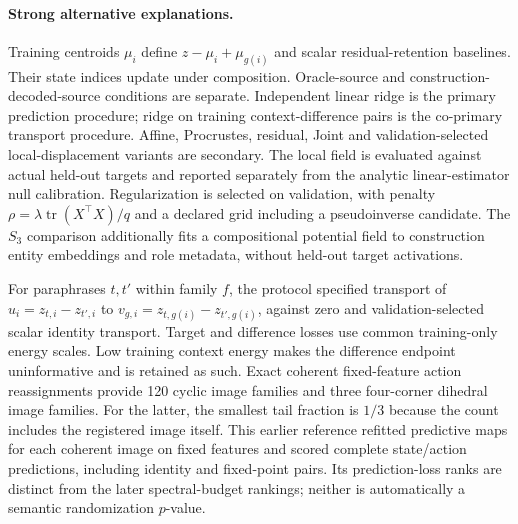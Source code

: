 \paragraph{Strong alternative explanations.}
Training centroids $\mu_i$ define $z-\mu_i+\mu_{g(i)}$ and scalar residual-retention baselines. Their state indices update under composition. Oracle-source and construction-decoded-source conditions are separate. Independent linear ridge is the primary prediction procedure; ridge on training context-difference pairs is the co-primary transport procedure. Affine, Procrustes, residual, Joint and validation-selected local-displacement variants are secondary. The local field is evaluated against actual held-out targets and reported separately from the analytic linear-estimator null calibration. Regularization is selected on validation, with penalty $\rho=\lambda\operatorname{tr}(X^\top X)/q$ and a declared grid including a pseudoinverse candidate. The $S_3$ comparison additionally fits a compositional potential field to construction entity embeddings and role metadata, without held-out target activations.

For paraphrases $t,t'$ within family $f$, the protocol specified transport of $u_i=z_{t,i}-z_{t',i}$ to $v_{g,i}=z_{t,g(i)}-z_{t',g(i)}$, against zero and validation-selected scalar identity transport. Target and difference losses use common training-only energy scales. Low training context energy makes the difference endpoint uninformative and is retained as such. Exact coherent fixed-feature action reassignments provide 120 cyclic image families and three four-corner dihedral image families. For the latter, the smallest tail fraction is $1/3$ because the count includes the registered image itself. This earlier reference refitted predictive maps for each coherent image on fixed features and scored complete state/action predictions, including identity and fixed-point pairs. Its prediction-loss ranks are distinct from the later spectral-budget rankings; neither is automatically a semantic randomization $p$-value.

